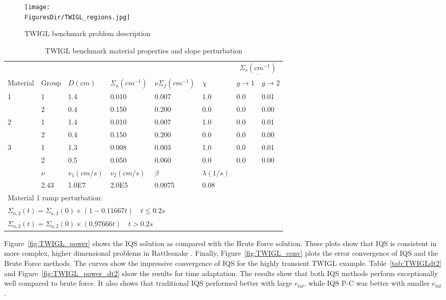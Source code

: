 \documentclass[12pt]{scrartcl}
\newcommand{\rattlesnake}{Rattlesnake }
\newcommand{\fig}[1]{Figure~\ref{#1}}                      %
\newcommand{\tbl}[1]{Table~\ref{#1}}                     %
\newcommand{\FiguresDir}{./figs}
\begin{document}
\begin{figure}[!htbp]
\begin{center}
\texttt{[image: \\FiguresDir/TWIGL\_regions.jpg]}
\caption{TWIGL benchmark problem description}
\label{fig:TWIGL_reg}
\end{center}
\end{figure}

\begin{table}[!htbp]
\begin{center}
\caption{TWIGL benchmark material properties and slope perturbation}
\label{tab:TWIGL_mat}
\begin{tabular}{llllllll}
\hline
  &  &  &  &  &  &  \multicolumn{2}{c}{$\underline{\Sigma_s (cm^{-1})} $} \\
Material & Group & $D (cm)$ & $\Sigma_a (cm^{-1})$ & $\nu\Sigma_f (cm^{-1})$ & $\chi$ & $g \rightarrow 1$ & $g \rightarrow 2$ \\
\hline
1 & 1 & 1.4 & 0.010 & 0.007 & 1.0 & 0.0 & 0.01 \\
  & 2 & 0.4 & 0.150 & 0.200 & 0.0 & 0.0 & 0.00  \\
2 & 1 & 1.4 & 0.010 & 0.007 & 1.0 & 0.0 & 0.01  \\
  & 2 & 0.4 & 0.150 & 0.200 & 0.0 & 0.0 & 0.00  \\
3 & 1 & 1.3 & 0.008 & 0.003 & 1.0 & 0.0 & 0.01  \\
  & 2 & 0.5 & 0.050 & 0.060 & 0.0 & 0.0 & 0.00  \\
\hline
  & $\nu$ & $v_1 (cm/s)$ & $v_2 (cm/s)$ & $\beta$ & $\lambda (1/s)$ &   &   \\
\hline
  & 2.43 & 1.0E7 & 2.0E5 & 0.0075 & 0.08 &   &   \\
\hline
 \multicolumn{8}{l}{\footnotesize Material 1 ramp perturbation:} \\
\multicolumn{8}{l}{\footnotesize $\Sigma_{a,2}(t)=\Sigma_{a,2}(0) \times (1-0.11667t) \quad t \leq 0.2 s$} \\
\multicolumn{8}{l}{\footnotesize $\Sigma_{a,2}(t)=\Sigma_{a,2}(0) \times (0.97666t) \quad t > 0.2 s$} \normalsize
\end{tabular}
\end{center}
\end{table}

\fig{fig:TWIGL_power} shows the IQS  solution as compared with the Brute Force solution.  These plots show that IQS is consistent in more complex, higher dimensional problems in \rattlesnake.  Finally, \fig{fig:TWIGL_conv} plots the error convergence of IQS and the Brute Force methods.  The curves show the impressive convergence of IQS for the highly transient TWIGL example.  \tbl{tab:TWIGLdt2} and \fig{fig:TWIGL_power_dt2} show the results for time adaptation.  The results show that both IQS methods perform exceptionally well compared to brute force.  It also shows that traditional IQS performed better with large $e_{tol}$, while IQS P-C was better with smaller $e_{tol}$.
\end{document}
